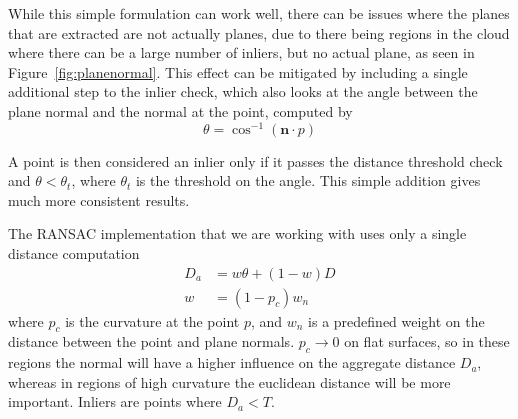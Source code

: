 \documentclass[11pt,a4paper]{kth-mag}
\begin{document}
While this simple formulation can work well, there can be issues where the
planes that are extracted are not actually planes, due to there being regions in
the cloud where there can be a large number of inliers, but no actual plane, as
seen in Figure~\ref{fig:planenormal}. This effect can be mitigated by including
a single additional step to the inlier check, which also looks at the angle
between the plane normal and the normal at the point, computed by
\begin{equation}
  \label{eq:5}
  \theta=\cos^{-1}(\mathbf{n}\cdot p)
\end{equation}

A point is then considered an inlier only if it passes the distance threshold
check and $\theta<\theta_t$, where $\theta_t$ is the threshold on the angle.
This simple addition gives much more consistent results.

The RANSAC implementation that we are working with uses only a single distance
computation
\begin{align}
  \label{eq:6}
  D_a&=w\theta + (1-w)D\\
  w&=(1-p_c)w_n
\end{align}
where $p_c$ is the curvature at the point $p$, and $w_n$ is a predefined weight
on the distance between the point and plane normals. $p_c\rightarrow 0$ on flat
surfaces, so in these regions the normal will have a higher influence on the
aggregate distance $D_a$, whereas in regions of high curvature the euclidean
distance will be more important. Inliers are points where $D_a<T$.
\end{document}
